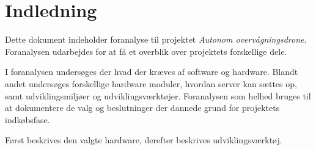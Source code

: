 \section{Indledning}

Dette dokument indeholder foranalyse til projektet \textit{Autonom overvågningsdrone}. 
Foranalysen udarbejdes for at få et overblik over projektets forskellige dele. 

I foranalysen undersøges der hvad der kræves af software og hardware. Blandt andet undersøges forskellige hardware moduler, hvordan server kan sættes op, samt udviklingsmiljøer og udviklingsværktøjer. Foranalysen som helhed bruges til at dokumentere de valg og beslutninger der dannede grund for projektets indkøbsfase. 

Først beskrives den valgte hardware, derefter beskrives udviklingsværktøj.
